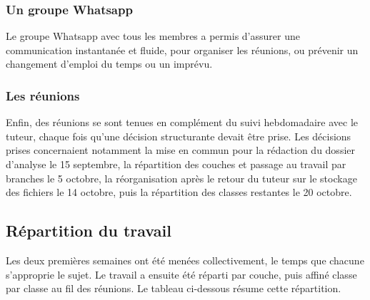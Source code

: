 \documentclass[a4paper,12pt]{article}
\begin{document}
\subsubsection{Un groupe Whatsapp}\label{un-groupe-whatsapp}

Le groupe Whatsapp avec tous les membres a permis d'assurer une
communication instantanée et fluide, pour organiser les réunions, ou
prévenir un changement d'emploi du temps ou un imprévu.

\subsubsection{Les réunions}\label{les-ruxe9unions}

Enfin, des réunions se sont tenues en complément du suivi hebdomadaire
avec le tuteur, chaque fois qu'une décision structurante devait être
prise. Les décisions prises concernaient notamment la mise en commun
pour la rédaction du dossier d'analyse le 15 septembre, la répartition
des couches et passage au travail par branches le 5 octobre, la
réorganisation après le retour du tuteur sur le stockage des fichiers le
14 octobre, puis la répartition des classes restantes le 20 octobre.

\subsection{Répartition du travail}\label{ruxe9partition-du-travail}

Les deux premières semaines ont été menées collectivement, le temps que
chacune s'approprie le sujet. Le travail a ensuite été réparti par
couche, puis affiné classe par classe au fil des réunions. Le tableau
ci-dessous résume cette répartition.

\newpage{}
\end{document}
